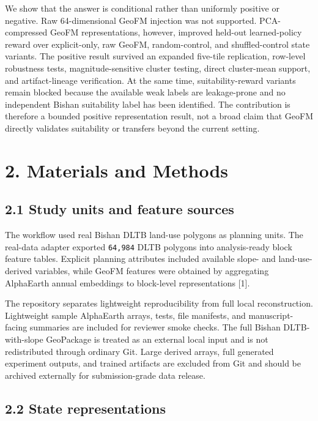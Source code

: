 \documentclass[
  11pt,
  a4paper,
]{article}
\begin{document}
We show that the answer is conditional rather than uniformly positive or
negative. Raw 64-dimensional GeoFM injection was not supported.
PCA-compressed GeoFM representations, however, improved held-out
learned-policy reward over explicit-only, raw GeoFM, random-control, and
shuffled-control state variants. The positive result survived an
expanded five-tile replication, row-level robustness tests,
magnitude-sensitive cluster testing, direct cluster-mean support, and
artifact-lineage verification. At the same time, suitability-reward
variants remain blocked because the available weak labels are
leakage-prone and no independent Bishan suitability label has been
identified. The contribution is therefore a bounded positive
representation result, not a broad claim that GeoFM directly validates
suitability or transfers beyond the current setting.

\section{2. Materials and Methods}\label{materials-and-methods}

\subsection{2.1 Study units and feature
sources}\label{study-units-and-feature-sources}

The workflow used real Bishan DLTB land-use polygons as planning units.
The real-data adapter exported \texttt{64,984} DLTB polygons into
analysis-ready block feature tables. Explicit planning attributes
included available slope- and land-use-derived variables, while GeoFM
features were obtained by aggregating AlphaEarth annual embeddings to
block-level representations {[}1{]}.

The repository separates lightweight reproducibility from full local
reconstruction. Lightweight sample AlphaEarth arrays, tests, file
manifests, and manuscript-facing summaries are included for reviewer
smoke checks. The full Bishan DLTB-with-slope GeoPackage is treated as
an external local input and is not redistributed through ordinary Git.
Large derived arrays, full generated experiment outputs, and trained
artifacts are excluded from Git and should be archived externally for
submission-grade data release.

\subsection{2.2 State representations}\label{state-representations}
\end{document}
